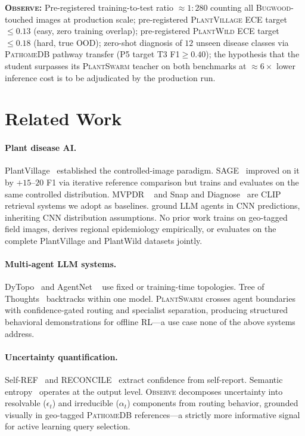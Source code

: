 \documentclass[11pt,twocolumn]{article}
\newcommand{\observe}{\textsc{Observe}\xspace}
\newcommand{\plantswarm}{\textsc{PlantSwarm}\xspace}
\newcommand{\pathomedb}{\textsc{PathomeDB}\xspace}
\newcommand{\bugwood}{\textsc{Bugwood}\xspace}
\newcommand{\pv}{\textsc{PlantVillage}\xspace}
\newcommand{\pw}{\textsc{PlantWild}\xspace}
\begin{document}
\noindent\textbf{\observe:}
Pre-registered training-to-test ratio ${\approx}1{:}280$
counting all \bugwood-touched images at production
scale;
pre-registered \pv ECE target ${\leq}0.13$ (easy,
zero training overlap);
pre-registered \pw ECE target ${\leq}0.18$ (hard, true
OOD);
zero-shot diagnosis of $12$ unseen disease classes via
\pathomedb pathway transfer (P5 target T3
F1${\geq}0.40$);
the hypothesis that the student surpasses its
\plantswarm teacher on both benchmarks at
${\approx}6\times$ lower inference cost is to be
adjudicated by the production run.

\section{Related Work}
\label{sec:related}

\paragraph{Plant disease AI.}
PlantVillage~\citep{mohanty2016plantvillage}
established the controlled-image paradigm.
SAGE~\citep{sage2025} improved on it by
$+15$--$20$ F1 via iterative reference
comparison but trains and evaluates on the
same controlled distribution. MVPDR
~\citep{tqwei2024mvpdr} and Snap and
Diagnose~\citep{tqwei2024snapdiagnose} are
CLIP retrieval systems we adopt as baselines.
\citet{chatdemeter2025} ground LLM agents
in CNN predictions, inheriting CNN distribution
assumptions. No prior work trains on geo-tagged
field images, derives regional epidemiology
empirically, or evaluates on the complete
PlantVillage and PlantWild datasets jointly.

\paragraph{Multi-agent LLM systems.}
DyTopo~\citep{lu2026dytopo} and AgentNet
~\citep{agentnet2025} use fixed or
training-time topologies. Tree of
Thoughts~\citep{yao2024tot} backtracks within
one model. \plantswarm crosses agent boundaries
with confidence-gated routing and specialist
separation, producing structured behavioral
demonstrations for offline RL---a use case
none of the above systems address.

\paragraph{Uncertainty quantification.}
Self-REF~\citep{selfref2025icml} and
RECONCILE~\citep{chen2023reconcile} extract
confidence from self-report. Semantic
entropy~\citep{kuhn2023semantic} operates at
the output level. \observe decomposes uncertainty
into resolvable ($\epsilon_t$) and irreducible
($\alpha_t$) components from routing behavior,
grounded visually in geo-tagged \pathomedb
references---a strictly more informative signal
for active learning query selection.
\end{document}
